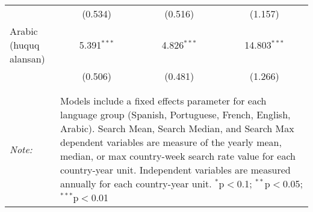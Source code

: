 \begin{table}[!htbp]
\begin{tabular}{@{\extracolsep{5pt}}lccc}
  & (0.534) & (0.516) & (1.157) \\ 
  Arabic (huquq alansan) & 5.391$^{***}$ & 4.826$^{***}$ & 14.803$^{***}$ \\ 
  & (0.506) & (0.481) & (1.266) \\ 
 \hline \\[-1.8ex] 
\hline 
\hline \\[-1.8ex] 
\textit{Note:}  & \multicolumn{3}{l}{\parbox[t]{8cm}{Models include a fixed effects parameter for each language group (Spanish, Portuguese, French, English, Arabic). Search Mean, Search Median, and Search Max dependent variables are measure of the yearly mean, median, or max country-week search rate value for each country-year unit. Independent variables are measured annually for each country-year unit. $^{*}$p$<$0.1; $^{**}$p$<$0.05; $^{***}$p$<$0.01}} \\ 
\end{tabular} 
\end{table} 
